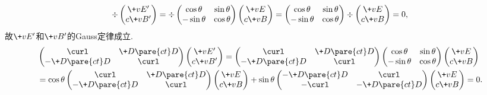 \documentclass[hidelinks]{ctexart}
\begin{document}
\[ \div \begin{pmatrix}
    \+vE' \\ c\+vB'
\end{pmatrix} = \div \begin{pmatrix}
    \cos \theta & \sin \theta \\
    -\sin\theta & \cos \theta
\end{pmatrix} \begin{pmatrix}
    \+vE \\ c\+vB
\end{pmatrix} = \begin{pmatrix}
    \cos \theta & \sin \theta \\
    -\sin\theta & \cos \theta
\end{pmatrix} \div \begin{pmatrix}
    \+vE \\ c\+vB
\end{pmatrix} = 0, \]
故$\+vE'$和$\+vB'$的Gauss定律成立.
\begin{align*}
    & \begin{pmatrix}
        \curl & \displaystyle \+D{\pare{ct}}D{} \\
        \displaystyle -\+D{\pare{ct}}D{} & \curl
    \end{pmatrix}\begin{pmatrix}
        \+vE' \\ c\+vB'
    \end{pmatrix} = \begin{pmatrix}
        \curl & \displaystyle \+D{\pare{ct}}D{} \\
        \displaystyle -\+D{\pare{ct}}D{} & \curl
    \end{pmatrix}\begin{pmatrix}
    \cos \theta & \sin \theta \\
    -\sin\theta & \cos \theta
\end{pmatrix}\begin{pmatrix}
        \+vE \\ c\+vB
    \end{pmatrix} \\
    &= \cos\theta \begin{pmatrix}
        \curl & \displaystyle \+D{\pare{ct}}D{} \\
        \displaystyle -\+D{\pare{ct}}D{} & \curl
    \end{pmatrix} \begin{pmatrix}
        \+vE \\ c\+vB
    \end{pmatrix} + \sin\theta \begin{pmatrix}
        \displaystyle -\+D{\pare{ct}}D{} & \curl \\
        -\curl & -\displaystyle \+D{\pare{ct}}D{}
    \end{pmatrix} \begin{pmatrix}
        \+vE \\ c\+vB
    \end{pmatrix} = 0.
\end{align*}
\end{document}

